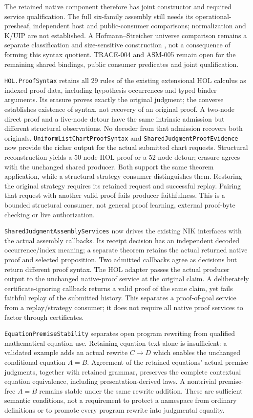 \documentclass[11pt]{article}
\theoremstyle{definition}
\theoremstyle{remark}
\begin{document}
The retained native component therefore has joint constructor and required
service qualification. The full six-family assembly still needs its
operational-presheaf, independent host and public-consumer comparisons;
normalization and K/UIP are not established. A Hofmann--Streicher universe comparison remains a separate
classification and size-sensitive construction
\cite{AwodeyHofmannStreicherUniverses}, not a consequence of forming this
syntax quotient. TRACE-004 and ASM-005 remain open for the remaining shared
bindings, public consumer predicates and joint qualification.

\nolinkurl{HOL.ProofSyntax} retains all 29 rules of the existing extensional
HOL calculus as indexed proof data, including hypothesis occurrences and
typed binder arguments. Its erasure proves exactly the original judgment;
the converse establishes existence of syntax, not recovery of an original
proof. A two-node direct proof and a five-node detour have the same intrinsic
admission but different structural observations. No decoder from that
admission recovers both originals. \nolinkurl{UniformListChartProofSyntax} and
\nolinkurl{SharedJudgmentProofEvidence} now provide the richer output for the
actual submitted chart requests. Structural reconstruction yields a 50-node
HOL proof or a 52-node detour; erasure agrees with the unchanged shared
producer. Both support the same theorem application, while a structural
strategy consumer distinguishes them. Restoring the original strategy requires
its retained request and successful replay. Pairing that request with another
valid proof fails producer faithfulness. This is a bounded structural consumer,
not general proof learning, external proof-byte checking or live authorization.

\nolinkurl{SharedJudgmentAssemblyServices} now drives the existing NIK
interfaces with the actual assembly callbacks. Its receipt decision has an
independent decoded occurrence/index meaning; a separate theorem retains the
actual returned native proof and selected proposition. Two admitted callbacks
agree as decisions but return different proof syntax. The HOL adapter passes
the actual producer output to the unchanged native-proof service at the
original claim. A deliberately certificate-ignoring callback returns a valid
proof of the same claim, yet fails faithful replay of the submitted history.
This separates a proof-of-goal service from a replay/strategy consumer; it
does not require all native proof services to factor through certificates.

\nolinkurl{EquationPremiseStability} separates open program rewriting from
qualified mathematical equation use. Retaining equation text alone is
insufficient: a validated example adds an actual rewrite $C\to D$ which
enables the unchanged conditional equation $A=B$. Agreement of the retained
equations' actual premise judgments, together with retained grammar, preserves
the complete contextual equation equivalence, including presentation-derived
laws. A nontrivial premise-free $A=B$ remains stable under the same rewrite
addition. These are sufficient semantic conditions, not a requirement to
protect a namespace from ordinary definitions or to promote every program
rewrite into judgmental equality.
\end{document}
